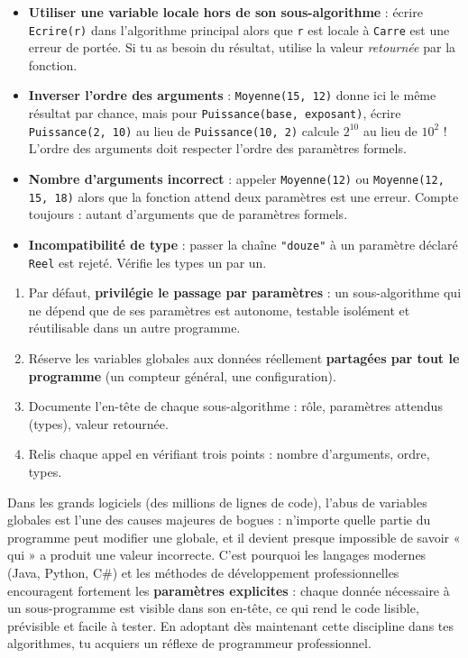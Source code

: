\documentclass[11pt]{article}
\begin{document}
\begin{attention}
\begin{itemize}
  \item \textbf{Utiliser une variable locale hors de son sous-algorithme} : écrire \texttt{Ecrire(r)} dans l'algorithme principal alors que \texttt{r} est locale à \texttt{Carre} est une erreur de portée. Si tu as besoin du résultat, utilise la valeur \emph{retournée} par la fonction.
  \item \textbf{Inverser l'ordre des arguments} : \texttt{Moyenne(15, 12)} donne ici le même résultat par chance, mais pour \texttt{Puissance(base, exposant)}, écrire \texttt{Puissance(2, 10)} au lieu de \texttt{Puissance(10, 2)} calcule $2^{10}$ au lieu de $10^2$ ! L'ordre des arguments doit respecter l'ordre des paramètres formels.
  \item \textbf{Nombre d'arguments incorrect} : appeler \texttt{Moyenne(12)} ou \texttt{Moyenne(12, 15, 18)} alors que la fonction attend deux paramètres est une erreur. Compte toujours : autant d'arguments que de paramètres formels.
  \item \textbf{Incompatibilité de type} : passer la chaîne \texttt{"douze"} à un paramètre déclaré \texttt{Reel} est rejeté. Vérifie les types un par un.
\end{itemize}
\end{attention}

\begin{methode}
\begin{enumerate}
  \item Par défaut, \textbf{privilégie le passage par paramètres} : un sous-algorithme qui ne dépend que de ses paramètres est autonome, testable isolément et réutilisable dans un autre programme.
  \item Réserve les variables globales aux données réellement \textbf{partagées par tout le programme} (un compteur général, une configuration).
  \item Documente l'en-tête de chaque sous-algorithme : rôle, paramètres attendus (types), valeur retournée.
  \item Relis chaque appel en vérifiant trois points : nombre d'arguments, ordre, types.
\end{enumerate}
\end{methode}

\begin{savaistu}
Dans les grands logiciels (des millions de lignes de code), l'abus de variables globales est l'une des causes majeures de bogues : n'importe quelle partie du programme peut modifier une globale, et il devient presque impossible de savoir « qui » a produit une valeur incorrecte. C'est pourquoi les langages modernes (Java, Python, C\#) et les méthodes de développement professionnelles encouragent fortement les \textbf{paramètres explicites} : chaque donnée nécessaire à un sous-programme est visible dans son en-tête, ce qui rend le code lisible, prévisible et facile à tester. En adoptant dès maintenant cette discipline dans tes algorithmes, tu acquiers un réflexe de programmeur professionnel.
\end{savaistu}
\end{document}
